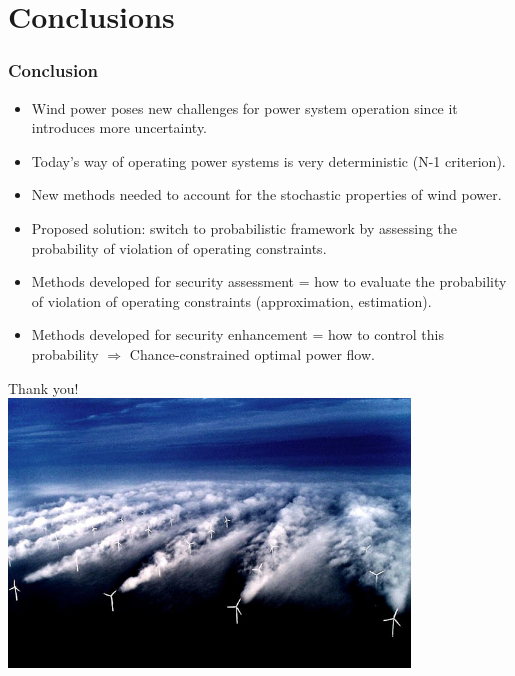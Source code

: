 \documentclass{beamer}
\begin{document}
\section{Conclusions}
\begin{frame}
\frametitle{Conclusion}
\begin{itemize}
\item Wind power poses new challenges for power system operation since it introduces more uncertainty.
\item Today's way of operating power systems is very deterministic (N-1 criterion).
\item New methods needed to account for the stochastic properties of wind power.
\item Proposed solution: switch to probabilistic framework by assessing the probability of violation of operating constraints.
\item Methods developed for security assessment = how to evaluate the probability of violation of operating constraints (approximation, estimation).
\item Methods developed for security enhancement = how to control this probability $\Rightarrow$ Chance-constrained optimal power flow.
\end{itemize}
\end{frame}

\begin{frame}[plain]
\begin{center}
Thank you!\\
\vfill
\includegraphics[width=0.8\textwidth]{Figs/wakes}
\end{center}
\end{frame}
\end{document}
